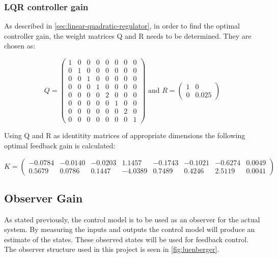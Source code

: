 \subsubsection{LQR controller gain}
As described in \cref{sec:linear-quadratic-regulator}, in order to find the optimal controller gain, the weight matrices Q and R needs to be determined. They are chosen as:

\begin{equation}
	Q =
	\left(\begin{array}{cccccccc}
		1 & 0 & 0 & 0 & 0 & 0 & 0 & 0  \\
		0 & 1 & 0 & 0 & 0 & 0 & 0 & 0  \\
		0 & 0 & 1 & 0 & 0 & 0 & 0 & 0  \\
		0 & 0 & 0 & 1 & 0 & 0 & 0 & 0  \\
		0 & 0 & 0 & 0 & 2 & 0 & 0 & 0  \\
		0 & 0 & 0 & 0 & 0 & 1 & 0 & 0  \\
		0 & 0 & 0 & 0 & 0 & 0 & 2 & 0  \\
		0 & 0 & 0 & 0 & 0 & 0 & 0 & 1
	\end{array}\right)
	\text{  and  }
	R =
		\left(\begin{array}{cc}
		1 & 0  \\
		0 & 0.025
	\end{array}\right)
\end{equation}

Using Q and R as identitity matrices of appropriate dimensions the following optimal feedback gain is calculated:

\begin{equation}
	K =
	\left(\begin{array}{cccccccccc}
		-0.0784 &  -0.0140 &  -0.0203 &   1.1457 &  -0.1743 &  -0.1021 &  -0.6274 &   0.0049 \\
		0.5679 &   0.0786 &   0.1447 &  -4.0389 &   0.7489 &   0.4246 &   2.5119 &   0.0041
	\end{array}\right)
\end{equation}

\subsection{Observer Gain} \label{sec:observer-gain}
As stated previously, the control model is to be used as an observer for the actual system. By measuring the inputs and outputs the control model will produce an estimate of the states. These observed states will be used for feedback control. The observer structure used in this project is seen in \cref{fig:luenberger}.

